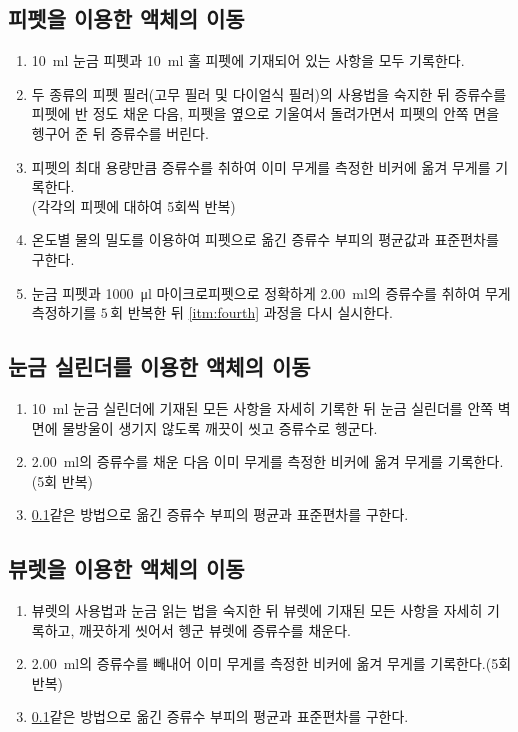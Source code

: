\documentclass{GSHS-chemexp}
\begin{document}
	\subsection{피펫을 이용한 액체의 이동} \label{subsec:second}
	\begin{enumerate}
		\item \SI{10}{\milli\litre} 눈금 피펫과 \SI{10}{\milli\litre} 
		홀 피펫에 기재되어 있는 사항을 모두 기록한다.
		\item 두 종류의 피펫 필러(고무 필러 및 다이얼식 필러)의 사용법을
		숙지한 뒤 증류수를 피펫에 반 정도 채운 다음,
		피펫을 옆으로 기울여서 돌려가면서 피펫의 안쪽 면을 헹구어 준 뒤
		증류수를 버린다.
		\item 피펫의 최대 용량만큼 증류수를 취하여
		이미 무게를 측정한 비커에 옮겨 무게를 기록한다.\\
		(각각의 피펫에 대하여 5회씩 반복)
		\item 온도별 물의 밀도를 이용하여
		피펫으로 옮긴 증류수 부피의 평균값과 표준편차를 구한다.
		\label{itm:fourth}
		\item 눈금 피펫과 \SI{1000}{\micro\litre} 마이크로피펫으로
		정확하게 \SI{2.00}{\milli\litre}의 증류수를 취하여
		무게 측정하기를 $5\,\mbox{회}$ 반복한 뒤
		\ref{itm:fourth} 과정을 다시 실시한다.
	\end{enumerate}
	
	\subsection{눈금 실린더를 이용한 액체의 이동}
	\begin{enumerate}
		\item \SI{10}{\milli\litre} 눈금 실린더에 기재된 모든 사항을
		자세히 기록한 뒤 눈금 실린더를 안쪽 벽면에 물방울이 생기지 
		않도록 깨끗이 씻고 증류수로 헹군다.
		\item \SI{2.00}{\milli\litre}의 증류수를 채운 다음
		이미 무게를 측정한 비커에 옮겨 무게를 기록한다.(5회 반복)
		\item \ref{subsec:second}\과 같은 방법으로 옮긴 증류수 부피의 
		평균과 표준편차를 구한다.
	\end{enumerate}
	
	\subsection{뷰렛을 이용한 액체의 이동}
	\begin{enumerate}
		\item 뷰렛의 사용법과 눈금 읽는 법을 숙지한 뒤
		뷰렛에 기재된 모든 사항을 자세히 기록하고,
		깨끗하게 씻어서 헹군 뷰렛에 증류수를 채운다.
		\item \SI{2.00}{\milli\litre}의 증류수를 빼내어
		이미 무게를 측정한 비커에 옮겨 무게를 기록한다.(5회 반복)
		\item \ref{subsec:second}\과 같은 방법으로 옮긴 증류수 부피의 
		평균과 표준편차를 구한다.
	\end{enumerate}
	
\end{document}
